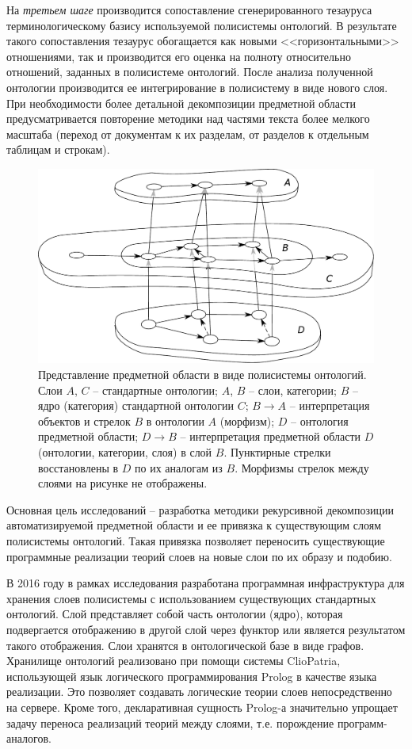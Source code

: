 \documentclass[12pt,a4paper]{ltxdoc}
\begin{document}
На \emph{третьем шаге} производится сопоставление сгенерированного тезауруса терминологическому базису используемой полисистемы онтологий. В результате такого сопоставления тезаурус обогащается как новыми <<горизонтальными>> отношениями, так и производится его оценка на полноту относительно отношений, заданных в полисистеме онтологий. После анализа полученной онтологии производится ее интегрирование в полисистему в виде нового слоя. При необходимости более детальной декомпозиции предметной области предусматривается повторение методики над частями текста более мелкого масштаба (переход от документам к их разделам, от разделов к отдельным таблицам и строкам).
\begin{figure}[hbt]
  \centering
\includegraphics[width=0.7\linewidth]{domain-polysistem}
\caption[Полиситема онтологий предметной области]{\footnotesize Представление предметной области в виде полисистемы онтологий. \\[0.3em] {Слои $A$, $C$ -- стандартные онтологии; $A$, $B$ -- слои, категории; $B$ -- ядро (категория) стандартной онтологии $C$; $B\to A$ -- интерпретация объектов и стрелок $B$ в онтологии $A$ (морфизм); $D$ -- онтология предметной области; $D\to B$ -- интерпретация предметной области $D$ (онтологии, категории, слоя) в слой $B$. Пунктирные стрелки восстановлены в $D$ по их аналогам из $B$. Морфизмы стрелок между слоями на рисунке не отображены.}}

  \label{fig:domain-polysistem}
\end{figure}

Основная цель исследований -- разработка методики рекурсивной декомпозиции автоматизируемой предметной области и ее привязка к существующим слоям полисистемы онтологий. Такая привязка позволяет переносить существующие программные реализации теорий слоев на новые слои по их образу и подобию.

В 2016 году в рамках исследования разработана программная инфраструктура для хранения слоев полисистемы с использованием существующих стандартных онтологий. Слой представляет собой часть онтологии (ядро), которая подвергается отображению в другой слой через функтор или является результатом такого отображения. Слои хранятся в онтологической базе в виде графов. Хранилище онтологий реализовано при помощи системы ClioPatria, использующей язык логического программирования Prolog в качестве языка реализации.  Это позволяет создавать логические теории слоев непосредственно на сервере. Кроме того, декларативная сущность Prolog-а значительно упрощает задачу переноса реализаций теорий между слоями, т.е. порождение программ-аналогов.
\end{document}
